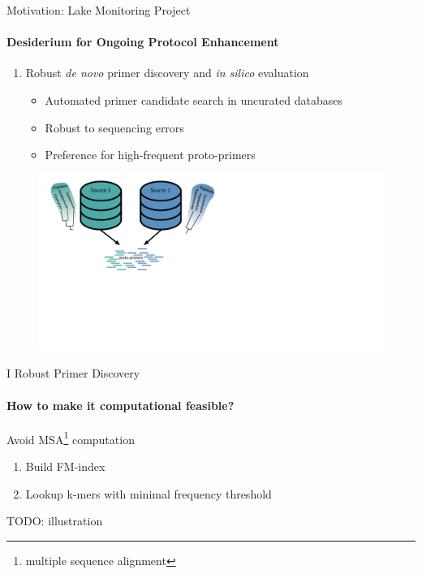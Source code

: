 \documentclass[xcolor=dvipsnames,envcountsect]{beamer}
\begin{document}
\begin{frame}{Motivation: Lake Monitoring Project}
\framesubtitle{Desiderium for Ongoing Protocol Enhancement}
\begin{enumerate}[I]
    \item Robust {\it de novo} primer discovery and {\it in silico} evaluation %
    \begin{itemize}
        \item Automated primer candidate search in uncurated databases %
            \item Robust to sequencing errors
            \item Preference for high-frequent proto-primers
    \end{itemize}
\end{enumerate}
\begin{figure}
    \includegraphics[scale=.4]{DB_protoprimers}
\end{figure}
\end{frame}

\begin{frame}{I Robust Primer Discovery}
\framesubtitle{How to make it computational feasible?}
Avoid MSA\footnote{multiple sequence alignment} computation
    \begin{enumerate}
        \item Build FM-index
        \item Lookup k-mers with minimal frequency threshold
    \end{enumerate}
    TODO: illustration

\end{frame}
\end{document}
